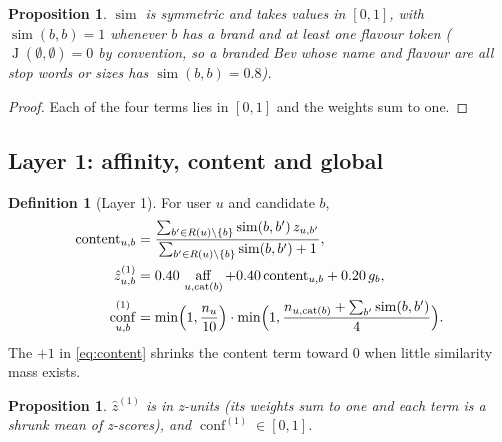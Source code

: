 \documentclass[11pt]{article}
\DeclareMathOperator{\simi}{sim}
\DeclareMathOperator{\aff}{aff}
\DeclareMathOperator{\conf}{conf}
\DeclareMathOperator{\cat}{cat}
\DeclareMathOperator{\jac}{J}
\newcommand{\zhat}{\hat{z}}
\theoremstyle{plain}
\newtheorem{proposition}[theorem]{Proposition}
\theoremstyle{definition}
\newtheorem{definition}[theorem]{Definition}
\theoremstyle{remark}
\begin{document}
\begin{proposition}
$\simi$ is symmetric and takes values in $[0, 1]$, with $\simi(b, b) = 1$ whenever $b$ has a brand and at least one flavour token ($\jac(\emptyset, \emptyset) = 0$ by convention, so a branded Bev whose name and flavour are all stop words or sizes has $\simi(b, b) = 0.8$).
\end{proposition}
\begin{proof}
Each of the four terms lies in $[0,1]$ and the weights sum to one.
\end{proof}

\subsection{Layer 1: affinity, content and global}

\begin{definition}[Layer 1]\label{def:layer1}
For user $u$ and candidate $b$,
\begin{align}
\mathrm{content}_{u,b} &= \frac{\sum_{b' \in R(u) \setminus \{b\}} \simi(b, b')\, z_{u,b'}}{\sum_{b' \in R(u) \setminus \{b\}} \simi(b, b') + 1}, \label{eq:content}\\
\zhat^{(1)}_{u,b} &= 0.40\,\aff_{u, \cat(b)} + 0.40\,\mathrm{content}_{u,b} + 0.20\, g_b, \label{eq:z1}\\
\conf^{(1)}_{u,b} &= \min\Bigl(1, \frac{n_u}{10}\Bigr)\cdot \min\Bigl(1, \frac{n_{u,\cat(b)} + \sum_{b'} \simi(b, b')}{4}\Bigr). \label{eq:conf1}
\end{align}
The $+1$ in \eqref{eq:content} shrinks the content term toward $0$ when little similarity mass exists.
\end{definition}

\begin{proposition}
$\zhat^{(1)}$ is in z-units (its weights sum to one and each term is a shrunk mean of z-scores), and $\conf^{(1)} \in [0, 1]$.
\end{proposition}
\end{document}
